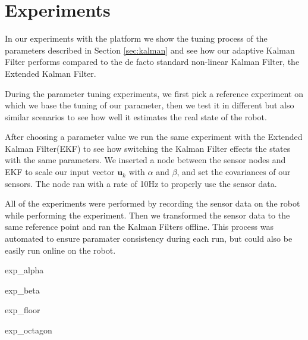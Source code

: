 \documentclass[class=report, crop=false]{standalone}
\begin{document}
\chapter{Experiments}

In our experiments with the platform we show the tuning process of the parameters described in Section \ref{sec:kalman} and see how our adaptive Kalman Filter performs compared to the de facto standard non-linear Kalman Filter, the Extended Kalman Filter.

During the parameter tuning experiments, we first pick a reference experiment on which we base the tuning of our parameter, then we test it in different but also similar scenarios to see how well it estimates the real state of the robot.

After choosing a parameter value we run the same experiment with the Extended Kalman Filter(EKF) to see how switching the Kalman Filter effects the states with the same parameters. We inserted a node between the sensor nodes and EKF to scale our input vector $\textbf{u}_k$ with $\alpha$ and $\beta$, and set the covariances of our sensors. The node ran with a rate of 10Hz to properly use the sensor data.

All of the experiments were performed by recording the sensor data on the robot while performing the experiment. Then we transformed the sensor data to the same reference point and ran the Kalman Filters offline. This process was automated to ensure paramater consistency during each run, but could also be easily run online on the robot.

{exp_alpha}

{exp_beta}

{exp_floor}

{exp_octagon}
\end{document}
